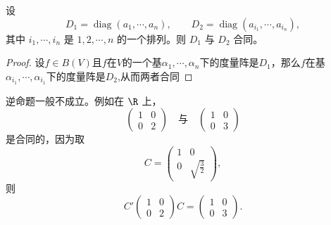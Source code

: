 \begin{lemma}
	设
	\[
	D_1=\operatorname{diag}(a_1,\cdots,a_n),
	\qquad
	D_2=\operatorname{diag}(a_{i_1},\cdots,a_{i_n}),
	\]
	其中 $i_1,\cdots,i_n$ 是 $1,2,\cdots,n$ 的一个排列。则 $D_1$ 与 $D_2$ 合同。
\end{lemma}

\begin{proof}
设$f\in B(V)$且$f$在$V$的一个基$\alpha_1,\cdots,\alpha_n$下的度量阵是$D_1$，那么$f$在基$\alpha_{i_1},\cdots,\alpha_{i_1}$下的度量阵是$D_2$,从而两者合同
\end{proof}

逆命题一般不成立。例如在 $\R$ 上，
\[
\begin{pmatrix}
	1&0\\
	0&2
\end{pmatrix}
\quad\text{与}\quad
\begin{pmatrix}
	1&0\\
	0&3
\end{pmatrix}
\]
是合同的，因为取
\[
C=\begin{pmatrix}
	1&0\\
	0&\sqrt{\frac32}
\end{pmatrix},
\]
则
\[
C'
\begin{pmatrix}
	1&0\\
	0&2
\end{pmatrix}
C
=
\begin{pmatrix}
	1&0\\
	0&3
\end{pmatrix}.
\]




